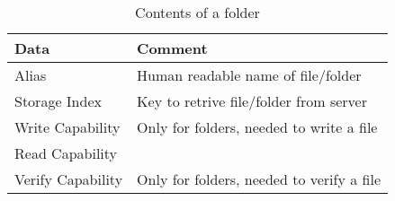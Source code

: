 \begin{table}
  \centering
  \caption{Contents of a folder}
  \begin{tabular}{ | l | l |}
    \hline
    \textbf{Data}       & \textbf{Comment}                          \\ \hline
     Alias              & Human readable name of file/folder        \\ \hline
     Storage Index      & Key to retrive file/folder from server    \\ \hline
     Write Capability   & Only for folders, needed to write a file  \\ \hline
     Read Capability    &                                           \\ \hline
     Verify Capability  & Only for folders, needed to verify a file  \\ \hline
  \end{tabular}
  \label{tbl:folder:contents}
\end{table}
